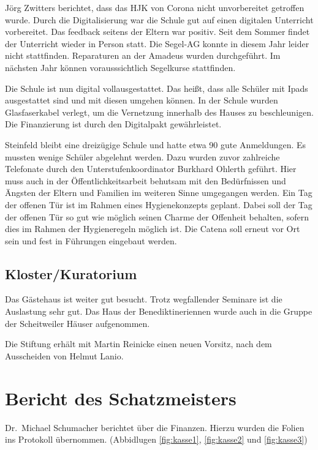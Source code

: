 \documentclass[a4paper, 11pt]{article}
\begin{document}
Jörg Zwitters berichtet, dass das HJK von Corona nicht unvorbereitet getroffen wurde. Durch die Digitalisierung war die Schule gut auf einen digitalen Unterricht vorbereitet. Das feedback seitens der Eltern war positiv.
Seit dem Sommer findet der Unterricht wieder in Person statt.
Die Segel-AG konnte in diesem Jahr leider nicht stattfinden. Reparaturen an der Amadeus wurden durchgeführt. Im nächsten Jahr können vorausssichtlich Segelkurse stattfinden.

Die Schule ist nun digital vollausgestattet. Das heißt, dass alle Schüler mit Ipads ausgestattet sind und mit diesen umgehen können.
In der Schule wurden Glasfaserkabel verlegt, um die Vernetzung innerhalb des Hauses zu beschleunigen.
Die Finanzierung ist durch den Digitalpakt gewährleistet.

Steinfeld bleibt eine dreizügige Schule und hatte etwa 90 gute Anmeldungen. Es mussten wenige Schüler abgelehnt werden. Dazu wurden zuvor zahlreiche Telefonate durch den Unterstufenkoordinator Burkhard Ohlerth geführt.
Hier muss auch in der Öffentlichkeitsarbeit behutsam mit den Bedürfnissen und Ängsten der Eltern und Familien im weiteren Sinne umgegangen werden.
Ein Tag der offenen Tür ist im Rahmen eines Hygienekonzepts geplant. Dabei soll der Tag der offenen Tür so gut wie möglich seinen Charme der Offenheit behalten, sofern dies im Rahmen der Hygieneregeln möglich ist.
Die Catena soll erneut vor Ort sein und fest in Führungen eingebaut werden.




\subsection*{Kloster/Kuratorium}

Das Gästehaus ist weiter gut besucht. Trotz wegfallender Seminare ist die Auslastung sehr gut.
Das Haus der Benediktineriennen wurde auch in die Gruppe der Scheitweiler Häuser aufgenommen.

Die Stiftung erhält mit Martin Reinicke einen neuen Vorsitz, nach dem Ausscheiden von Helmut Lanio.


\section*{Bericht des Schatzmeisters}

Dr.~Michael Schumacher berichtet über die Finanzen. Hierzu wurden die Folien ins Protokoll übernommen. (Abbidlugen \ref{fig:kasse1}, \ref{fig:kasse2} und \ref{fig:kasse3})
\end{document}
